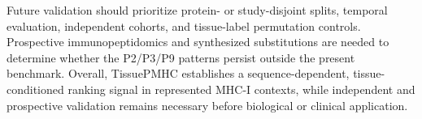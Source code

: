 Future validation should prioritize protein- or study-disjoint splits, temporal evaluation, independent cohorts, and tissue-label permutation controls. Prospective immunopeptidomics and synthesized substitutions are needed to determine whether the P2/P3/P9 patterns persist outside the present benchmark. Overall, TissuePMHC establishes a sequence-dependent, tissue-conditioned ranking signal in represented MHC-I contexts, while independent and prospective validation remains necessary before biological or clinical application.
